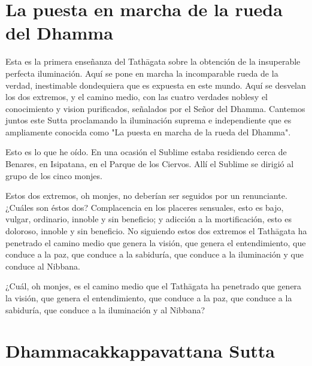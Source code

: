 \chapterTocDelegatePageNumber
\chapter{La puesta en marcha de la rueda del Dhamma}

\setTocDelegatedPageNumber
\englishText
\renewcommand{\englishTitle}{La puesta en marcha de la rueda del Dhamma}

\begin{leader}

Esta es la primera enseñanza del Tathāgata sobre la obtención de la insuperable perfecta iluminación.
Aquí se pone en marcha la incomparable rueda de la verdad, inestimable dondequiera que es expuesta en este mundo.
Aquí se desvelan los dos extremos, y el camino medio, con las cuatro verdades noblesy el conocimiento y vision purificados, señalados por el Señor del Dhamma.
Cantemos juntos este Sutta proclamando la iluminación suprema e independiente que es ampliamente conocida como "La puesta en marcha de la rueda del Dhamma".


\end{leader}


Esto es lo que he oído. En una ocasión el Sublime estaba residiendo cerca de Benares, en Isipatana, en el Parque de los Ciervos. Allí el Sublime se dirigió al grupo de los cinco monjes.

Estos dos extremos, oh monjes, no deberían ser seguidos por un renunciante. ¿Cuáles son éstos dos? Complacencia en los placeres sensuales, esto es bajo, vulgar, ordinario, innoble y sin beneficio; y adicción a la mortificación, esto es doloroso, innoble y sin beneficio. No siguiendo estos dos extremos el Tathāgata ha penetrado el camino medio que genera la visión, que genera el entendimiento, que conduce a la paz, que conduce a la sabiduría, que conduce a la iluminación y que conduce al Nibbana.

¿Cuál, oh monjes, es el camino medio que el Tathāgata ha penetrado que genera la visión, que genera el entendimiento, que conduce a la paz, que conduce a la sabiduría, que conduce a la iluminación y al Nibbana? 



\chapterTocSubIndentTrue
\chapter{Dhammacakkappavattana Sutta}

